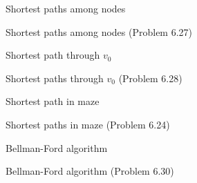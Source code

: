 \begin{frame}{Shortest paths among nodes}
  \begin{exampleblock}{Shortest paths among nodes (Problem 6.27)}
  \end{exampleblock}
\end{frame}
\begin{frame}{Shortest path through $v_0$}
  \begin{exampleblock}{Shortest paths through $v_0$ (Problem 6.28)}
  \end{exampleblock}
\end{frame}
\begin{frame}{Shortest path in maze}
  \begin{exampleblock}{Shortest paths in maze (Problem 6.24)}
  \end{exampleblock}
\end{frame}
\begin{frame}{Bellman-Ford algorithm}
  \begin{exampleblock}{Bellman-Ford algorithm (Problem 6.30)}
  \end{exampleblock}
\end{frame}

